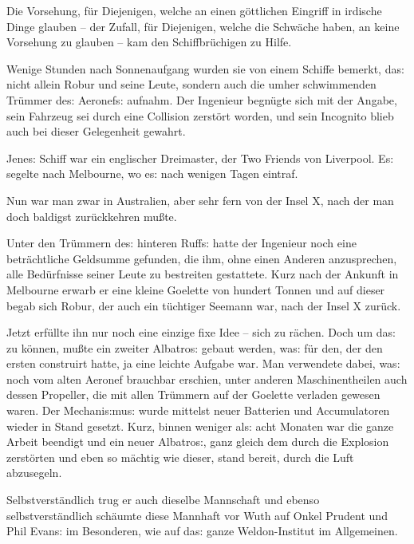 \documentclass[oneside,12pt]{book}
\newenvironment{antiqua}{\normalfont}{}
\newcommand{\s}{s:}
\begin{document}
Die Vorsehung, f\"ur Diejenigen, welche an einen g\"ottlichen
Eingriff in irdische Dinge glauben -- der Zufall, f\"ur Diejenigen,
welche die Schw\"ache haben, an keine Vorsehung zu glauben -- kam den
Schiffbr\"uchigen zu Hilfe.

Wenige Stunden nach Sonnenaufgang wurden sie von einem Schiffe
bemerkt, da{\s} nicht allein Robur und seine Leute, sondern auch die
umher schwimmenden Tr\"ummer de{\s} Aeronef{\s} aufnahm. Der
Ingenieur begn\"ugte sich mit der Angabe, sein Fahrzeug sei durch
eine Collision zerst\"ort worden, und sein Incognito blieb auch bei
dieser Gelegenheit gewahrt.

Jene{\s} Schiff war ein englischer Dreimaster, der
{\glqq}\begin{antiqua}Two Friends\end{antiqua}{\grqq} von
Liverpool. E{\s} segelte nach Melbourne, wo e{\s} nach wenigen Tagen
eintraf.

Nun war man zwar in Australien, aber sehr fern von der Insel X, nach
der man doch baldigst zur\"uckkehren mu{\ss}te.

Unter den Tr\"ummern de{\s} hinteren Ruff{\s} hatte der Ingenieur
noch eine betr\"achtliche Geldsumme gefunden, die ihm, ohne einen
Anderen anzusprechen, alle Bed\"urfnisse seiner Leute zu bestreiten
gestattete. Kurz nach der Ankunft in Melbourne erwarb er eine kleine
Goelette von hundert Tonnen und auf dieser begab sich Robur, der auch
ein t\"uchtiger Seemann war, nach der Insel X zur\"uck.

Jetzt erf\"ullte ihn nur noch eine einzige fixe Idee -- sich zu
r\"achen. Doch um da{\s} zu k\"onnen, mu{\ss}te ein zweiter
{\glqq}Albatro{\s}{\grqq} gebaut werden, wa{\s} f\"ur den, der den
ersten construirt hatte, ja eine leichte Aufgabe war. Man verwendete
dabei, wa{\s} noch vom alten Aeronef brauchbar erschien, unter
anderen Maschinentheilen auch dessen Propeller, die mit allen
Tr\"ummern auf der Goelette verladen gewesen waren. Der
Mechani{\s}mu{\s} wurde mittelst neuer Batterien und Accumulatoren
wieder in Stand gesetzt. Kurz, binnen weniger al{\s} acht Monaten war
die ganze Arbeit beendigt und ein neuer {\glqq}Albatro{\s}{\grqq},
ganz gleich dem durch die Explosion zerst\"orten und eben so
m\"achtig wie dieser, stand bereit, durch die Luft abzusegeln.

Selbstverst\"andlich trug er auch dieselbe Mannschaft und ebenso
selbstverst\"andlich sch\"aumte diese Mannhaft vor Wuth auf Onkel
Prudent und Phil Evan{\s} im Besonderen, wie auf da{\s} ganze
Weldon-Institut im Allgemeinen.
\end{document}
